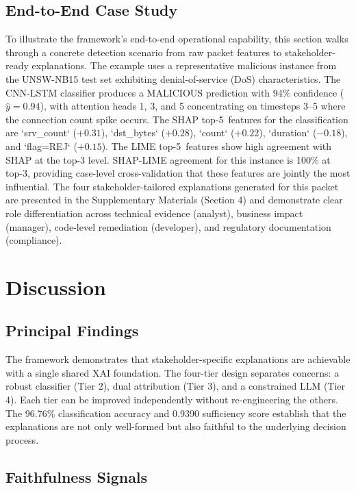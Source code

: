 \documentclass[sensors,apajournal,article,submit,moreauthors]{Definitions/mdpi}
\begin{document}
\subsection{End-to-End Case Study}

To illustrate the framework's \mbox{end-to-end} operational capability, this section walks through a concrete detection scenario from raw packet features to \mbox{stakeholder-ready} explanations. The example uses a representative malicious instance from the UNSW-NB15 test set exhibiting denial-of-service (DoS) characteristics. The CNN-LSTM classifier produces a MALICIOUS prediction with 94\% confidence ($\hat{y} = 0.94$), with attention heads 1, 3, and 5 concentrating on timesteps 3--5 where the connection count spike occurs. The SHAP \mbox{top-5 features} for the classification are `srv\_count` ($+0.31$), `dst\_bytes` ($+0.28$), `count` ($+0.22$), `duration` ($-0.18$), and `flag=REJ` ($+0.15$). The LIME \mbox{top-5 features} show high agreement with SHAP at the top-3 level. SHAP-LIME agreement for this instance is 100\% at top-3, providing case-level \mbox{cross-validation} that these features are jointly the most influential. The four \mbox{stakeholder-tailored} explanations generated for this packet are presented in the Supplementary Materials (Section 4) and demonstrate clear role differentiation across technical evidence (analyst), business impact (manager), code-level remediation (developer), and regulatory documentation (compliance).

\section{Discussion}

\subsection{Principal Findings}

The framework demonstrates that \mbox{stakeholder-specific} explanations are achievable with a single shared XAI foundation. The four-tier design separates concerns: a robust classifier (Tier 2), dual attribution (Tier 3), and a constrained LLM (Tier 4). Each tier can be improved independently without re-engineering the others. The 96.76\% classification accuracy and 0.9390 sufficiency score establish that the explanations are not only well-formed but also faithful to the underlying decision process.

\subsection{Faithfulness Signals}
\end{document}
